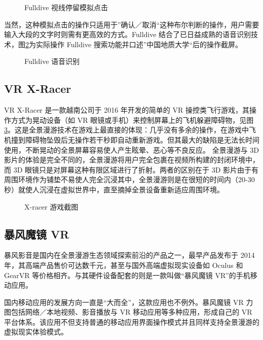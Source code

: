 \begin{figure}[htp]
\centering
{}
\caption{Fulldive 视线停留模拟点击}
\label{fig:fulldive3}
\end{figure}

当然，这种模拟点击的操作只适用于”确认／取消“这种布尔判断的操作，用户需要输入大段的文字时则需有更高效的方式。Fulldive 结合了已日益成熟的语音识别技术，图\ref{fig:fulldive4}为实际操作 Fulldive 搜索功能并口述”中国地质大学“后的操作截屏。

\begin{figure}[htp]
\centering
{}
\caption{Fulldive 语音识别}
\label{fig:fulldive4}
\end{figure}

\subsection{VR X-Racer}

VR X-Racer 是一款越南公司于 2016 年开发的简单的 VR 操控类飞行游戏，其操作方式为晃动设备（如 VR 眼镜或手机）来控制屏幕上的飞机躲避障碍物，见图\ref{fig:x-racer}。这是全景漫游技术在游戏上最直接的体现：几乎没有多余的操作，在游戏中飞机撞到障碍物坠毁后无操作若干秒即自动重新游戏。但其最大的缺陷是无法长时间使用，不断晃动的全景屏幕容易使人产生眩晕、恶心等不良反应。
全景漫游与 3D 影片的体验是完全不同的，全景漫游将用户完全包裹在视频所构建的封闭环境中，而 3D 眼镜只是对屏幕这种有限区域进行了折射。两者的区别在于 3D 影片由于有周围环境作为铺垫不易使人完全沉浸其中，全景漫游则是在很短的时间内（20-30 秒）就使人沉浸在虚拟世界中，直至摘掉全景设备重新适应周围环境。

\begin{figure}[htp]
\centering
{}
\caption{X-racer 游戏截图}
\label{fig:x-racer}
\end{figure}

\subsection{暴风魔镜 VR}

暴风影音是国内在全景漫游生态领域探索前沿的产品之一，最早产品发布于 2014 年，其高端产品售价可达数千元，甚至与国外高端虚拟现实设备如 Oculus 和 GearVR 等价格相齐。与其硬件设备配套的则是一款叫做“暴风魔镜 VR”的手机移动应用。

国内移动应用的发展方向一直是“大而全”，这款应用也不例外。暴风魔镜 VR 力图包括网络／本地视频、影音播放与 VR 移动应用等多种应用，形成自己的 VR 平台体系。该应用不但支持普通的移动应用界面操作模式并且同样支持全景漫游的虚拟现实体验模式。

